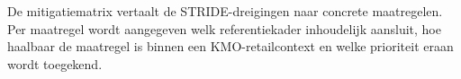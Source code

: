 \clearpage

\section{}%
\label{app:volledige-mitigatiematrix}

De mitigatiematrix vertaalt de STRIDE-dreigingen naar concrete maatregelen. Per maatregel wordt aangegeven welk referentiekader inhoudelijk aansluit, hoe haalbaar de maatregel is binnen een KMO-retailcontext en welke prioriteit eraan wordt toegekend.

\subsection{}%
\label{app:mitigaties-hoog}

